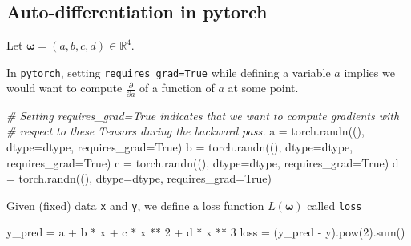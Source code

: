 \documentclass[
]{article}
\newenvironment{Shaded}{}{}
\newcommand{\BuiltInTok}[1]{\textcolor[rgb]{0.00,0.50,0.00}{#1}}
\newcommand{\CommentTok}[1]{\textcolor[rgb]{0.38,0.63,0.69}{\textit{#1}}}
\newcommand{\DecValTok}[1]{\textcolor[rgb]{0.25,0.63,0.44}{#1}}
\newcommand{\NormalTok}[1]{#1}
\newcommand{\OperatorTok}[1]{\textcolor[rgb]{0.40,0.40,0.40}{#1}}
\newcommand{\VariableTok}[1]{\textcolor[rgb]{0.10,0.09,0.49}{#1}}
\newcommand{\1}{\boldsymbol{1}}
\begin{document}
\hypertarget{auto-differentiation-in-pytorch}{%
\subsection{Auto-differentiation in
pytorch}\label{auto-differentiation-in-pytorch}}

Let \(\boldsymbol{\omega}= (a, b, c, d) \in \mathbb{R}^4\).

In \texttt{pytorch}, setting \texttt{requires\_grad=True} while defining
a variable \(a\) implies we would want to compute
\(\frac{\partial}{\partial a}\) of a function of \(a\) at some point.

\begin{Shaded}
\begin{Highlighting}[]
\CommentTok{\# Setting requires\_grad=True indicates that we want to compute gradients with}
\CommentTok{\# respect to these Tensors during the backward pass.}
\NormalTok{a }\OperatorTok{=}\NormalTok{ torch.randn((), dtype}\OperatorTok{=}\NormalTok{dtype, requires\_grad}\OperatorTok{=}\VariableTok{True}\NormalTok{)}
\NormalTok{b }\OperatorTok{=}\NormalTok{ torch.randn((), dtype}\OperatorTok{=}\NormalTok{dtype, requires\_grad}\OperatorTok{=}\VariableTok{True}\NormalTok{)}
\NormalTok{c }\OperatorTok{=}\NormalTok{ torch.randn((), dtype}\OperatorTok{=}\NormalTok{dtype, requires\_grad}\OperatorTok{=}\VariableTok{True}\NormalTok{)}
\NormalTok{d }\OperatorTok{=}\NormalTok{ torch.randn((), dtype}\OperatorTok{=}\NormalTok{dtype, requires\_grad}\OperatorTok{=}\VariableTok{True}\NormalTok{)}
\end{Highlighting}
\end{Shaded}

Given (fixed) data \texttt{x} and \texttt{y}, we define a loss function
\(L(\boldsymbol{\omega})\) called \texttt{loss}

\begin{Shaded}
\begin{Highlighting}[]
\NormalTok{y\_pred }\OperatorTok{=}\NormalTok{ a }\OperatorTok{+}\NormalTok{ b }\OperatorTok{*}\NormalTok{ x }\OperatorTok{+}\NormalTok{ c }\OperatorTok{*}\NormalTok{ x }\OperatorTok{**} \DecValTok{2} \OperatorTok{+}\NormalTok{ d }\OperatorTok{*}\NormalTok{ x }\OperatorTok{**} \DecValTok{3}
\NormalTok{loss }\OperatorTok{=}\NormalTok{ (y\_pred }\OperatorTok{{-}}\NormalTok{ y).}\BuiltInTok{pow}\NormalTok{(}\DecValTok{2}\NormalTok{).}\BuiltInTok{sum}\NormalTok{()}
\end{Highlighting}
\end{Shaded}
\end{document}
